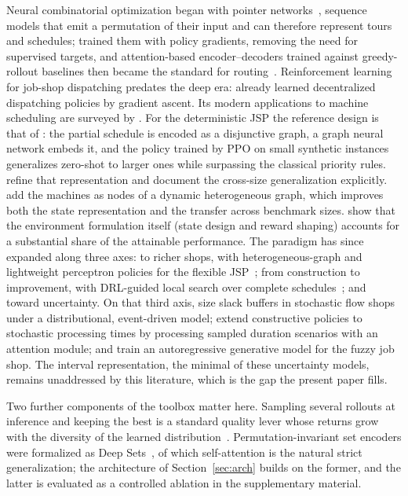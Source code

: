 \documentclass[preprint,authoryear,12pt]{elsarticle}
\theoremstyle{definition}
\theoremstyle{remark}
\begin{document}
Neural combinatorial optimization began with pointer
networks~\citep{Vinyals2015}, sequence models that emit a permutation
of their input and can therefore represent tours and schedules;
\citet{Bello2016} trained them with policy gradients, removing the
need for supervised targets, and attention-based
encoder--decoders trained against greedy-rollout baselines then
became the standard for routing~\citep{Kool2019,Nazari2018}.
Reinforcement learning for job-shop dispatching predates the deep
era: \citet{Gabel2008} already learned decentralized dispatching
policies by gradient ascent. Its modern applications to machine
scheduling are surveyed by \citet{Kayhan2023}. For the deterministic
JSP the reference design is that of \citet{Zhang2020L2D}: the partial
schedule is encoded as a disjunctive graph, a graph neural network
embeds it, and the policy trained by PPO on small synthetic instances
generalizes zero-shot to larger ones while surpassing the classical
priority rules. \citet{Park2021GNN} refine that representation and
document the cross-size generalization explicitly.
\citet{Ou2026HetGraph} add the machines as nodes of a dynamic
heterogeneous graph, which improves both the state representation and
the transfer across benchmark sizes.
\citet{Tassel2021} show that the environment formulation
itself (state design and reward shaping) accounts for a substantial
share of the attainable performance. The paradigm has since expanded
along three axes: to richer shops, with heterogeneous-graph and
lightweight perceptron policies for the flexible
JSP~\citep{Song2023FJSP,Yuan2024FJSP}; from construction to
improvement, with DRL-guided local search over complete
schedules~\citep{Zhang2024L2S}; and toward uncertainty. On that third
axis, \citet{Grumbach2024} size slack buffers in stochastic flow
shops under a distributional, event-driven model;
\citet{Smit2024Stochastic} extend constructive policies to stochastic
processing times by processing sampled duration scenarios with an
attention module; and \citet{Wang2025FuzzyAR} train an autoregressive
generative model for the fuzzy job shop. The interval
representation, the minimal of these uncertainty models, remains
unaddressed by this literature, which is the gap the present paper
fills.

Two further components of the toolbox matter here. Sampling several
rollouts at inference and keeping the best is a standard quality
lever whose returns grow with the diversity of the learned
distribution~\citep{Kool2019,Kwon2020}. Permutation-invariant set
encoders were formalized as Deep Sets~\citep{Zaheer2017}, of which
self-attention is the natural strict generalization; the architecture
of Section~\ref{sec:arch} builds on the former, and the latter is
evaluated as a controlled ablation in the supplementary material.
\end{document}
